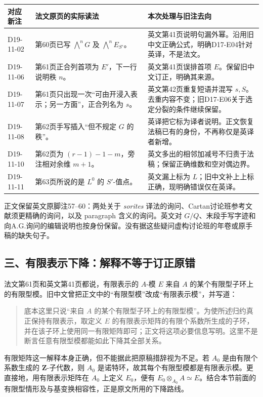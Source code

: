 \begin{longtable}{@{}p{.18\linewidth}p{.34\linewidth}p{.40\linewidth}@{}}
\toprule
对应新注 & 法文原页的实际读法 & 本次处理与旧注去向\\
\midrule
\endhead
D19-11-02 & 第60页已写 $\bigwedge^nG$ 及 $\bigwedge^nE_{S'}$。 & 英文第41页说明句漏外幂。沿用旧中文正确公式，明确D17-E04针对英译，不是法文。\\
D19-11-06 & 第61页正合列首项为 $E'$，下一行说明秩 $n$。 & 英文第41页误排首项 $E$。保留旧中文订正，明确其来源。\\
D19-11-07 & 第61页只出现一次“可由开浸入表示；另一方面”，正合列名为 $s$。 & 英文第42页重复短语并混写 $s,S$。去重内容不变；旧D17-E06关于选定分裂的条件继续保留。\\
D19-11-08 & 第62页手写插入“但不规定 $G$ 的秩”。 & 英译把它标为译者说明。正文恢复法稿已有的身份，不再称仅是英译者新增。\\
D19-11-10 & 第62页为 $(r-1)-1-m$，旁注相对余维 $m+1$。 & 英文多出的相邻加减号不归责于法稿；保留正确维数和空对偶边界。\\
D19-11-11 & 第63页所说的是 $L^0$ 的 $S'$-值点。 & 英文漏上标为 $L$；旧中文补上上标正确，现明确错误仅在英译。\\
\bottomrule
\end{longtable}

正文保留英文原脚注57--60：两处关于 \textit{sorites} 译法的询问、Cartan讨论班参考文献须更精确的询问，以及 paragraph 含义的询问。英文对 $G/Q$、末段手写字迹和向A.G.询问的编辑说明也按身份保留。没有据这些疑问虚构讨论班的年卷或原手稿的缺失句子。

\subsection*{三、有限表示下降：解释不等于订正原错}

法文第61页和英文第41页都说，有限表示的 $A$-模 $E$ 来自 $A$ 的某个有限型子环上的有限型模。旧中文曾把正文中的“有限型模”改成“有限表示模”，并写道：
\begin{quote}
底本这里只说“来自 $A$ 的某个有限型子环上的有限型模”。为使所述归约真正保持有限表示，取定义 $E$ 的有限表示矩阵的有限个系数所生成的子环，并在该子环上使用同一有限矩阵即可；正文将这项必要信息写明。这里不是断言任意有限型模都能如此下降其全部关系。
\end{quote}
有限矩阵这一解释本身正确，但不能据此把原稿措辞视为不足。若 $A_0$ 是由有限个系数生成的 $\mathbf Z$-子代数，则 $A_0$ 是诺特环，故其每个有限型模都是有限表示模。更直接地，用有限表示矩阵在 $A_0$ 上定义 $E_0$，便有 $E_0\otimes_{A_0}A\simeq E$。结合本节前面的有限型情形及与基变换相容性，正是原文所用的下降路线。

